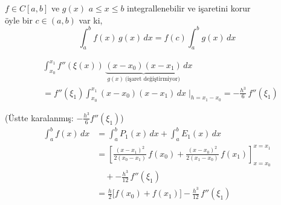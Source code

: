 \documentclass[11pt,a4paper]{article}
\begin{document}
\begin{teorem}
$f \in C[a,b]$ ve $g(x)$ $a \le x \le b$ integrallenebilir ve işaretini korur
\\öyle bir $c \in (a,b)$ var ki,
\[
  \int_a^b f(x)\,g(x)\,dx = f(c)\int_a^b g(x)\,dx
\]
\end{teorem}
\begin{align*}
  &\int_{x_0}^{x_1} f''(\xi(x))\,\underbrace{(x-x_0)(x-x_1)}_{g(x)\ \text{(işaret değiştirmiyor)}}\,dx\\
  &= f''(\xi_1)\int_{x_0}^{x_1} (x-x_0)(x-x_1)\,dx \;\Bigg|_{h = x_1 - x_0} = -\frac{h^3}{6}\,f''(\xi_1)
\end{align*}

{\small\color{kursunkalem}(Üstte karalanmış: $-\frac{h^3}{6}f''(\xi_1)$)}
\begin{align*}
  \int_a^b f(x)\,dx &= \int_a^b P_1(x)\,dx + \int_a^b E_1(x)\,dx\\
  &= \left[\frac{(x-x_1)^2}{2(x_0-x_1)}\,f(x_0) + \frac{(x-x_0)^2}{2(x_1-x_0)}\,f(x_1)\right]_{x=x_0}^{x=x_1}\\
  &\quad + -\frac{h^3}{12}\,f''(\xi_1)\\
  &= \frac{h}{2}\Big[f(x_0) + f(x_1)\Big] - \frac{h^3}{12}\,f''(\xi_1)
\end{align*}
\end{document}
